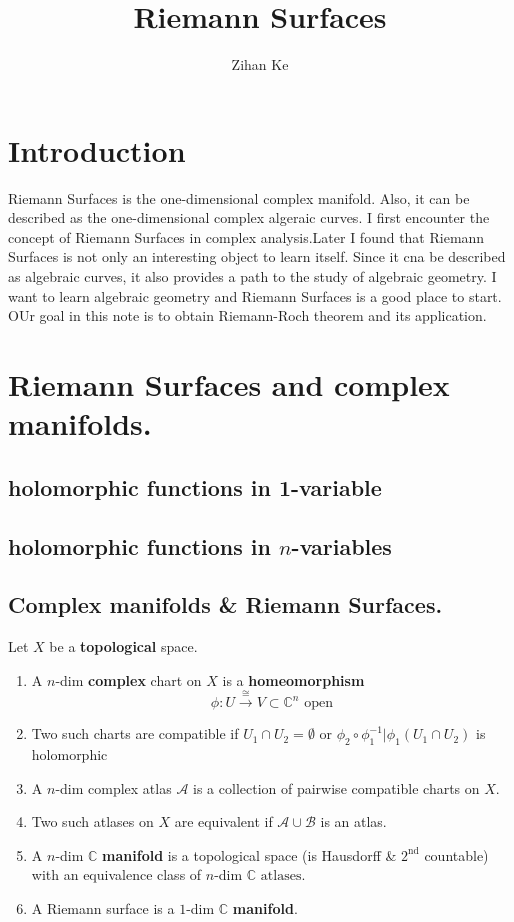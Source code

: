 \documentclass{article}
\title{Riemann Surfaces}
\author{Zihan Ke}
\begin{document}
\maketitle
\section*{Introduction}
Riemann Surfaces is the one-dimensional complex manifold. Also, it can be described as the one-dimensional complex algeraic curves. I first encounter the concept of Riemann Surfaces in complex analysis.Later I found that Riemann Surfaces is not only an interesting object to learn itself. Since it cna be described as algebraic curves, it also provides a path to the study of algebraic geometry. I want to learn algebraic geometry and Riemann Surfaces is a good place to start. 
OUr goal in this note is to obtain Riemann-Roch theorem and its application.
\newpage
\tableofcontents 
\newpage

\section{Riemann Surfaces and complex \textbf{manifolds}.}
\subsection{holomorphic functions in 1-variable}
\subsection{holomorphic functions in $n$-variables}
\subsection{Complex manifolds \& Riemann Surfaces.}

\begin{definition}
    Let $X$ be a \textbf{topological} space.
    \begin{enumerate}
        \item A $n$-dim \textbf{complex} chart on $X$ is a \textbf{homeomorphism}
        \[
        \phi : U \xrightarrow{\cong} V \subset \mathbb{C}^n \text{ open}
        \]
        \item Two such charts are compatible if
        $U_1 \cap U_2 = \emptyset$ or $\phi_2 \circ \phi_1^{-1} \big| \phi_1 (U_1 \cap U_2)$ is holomorphic
        \item A $n$-dim complex atlas $\mathcal{A}$ is a collection of pairwise compatible charts on $X$.
        \item Two such atlases on $X$ are equivalent if $\mathcal{A} \cup \mathcal{B}$ is an atlas.
        \item A $n$-dim $\mathbb{C}$ \textbf{manifold} is a topological space (is Hausdorff \& $2^{\text{nd}}$ countable) with an equivalence class of $n$-dim $\mathbb{C} \text{ atlases}$.
        \item A Riemann surface is a $1$-dim $\mathbb{C}$ \textbf{manifold}.
    \end{enumerate}
\end{definition}
\end{document}
